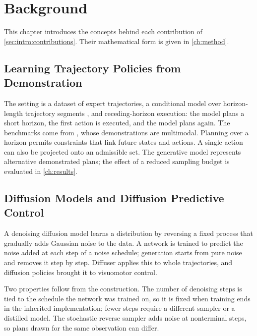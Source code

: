\chapter{Background}\label{ch:background}

This chapter introduces the concepts behind each contribution of \autoref{sec:intro:contributions}.
Their mathematical form is given in \autoref{ch:method}.

\section{Learning Trajectory Policies from Demonstration}\label{sec:bg:il}

The setting is a dataset of expert trajectories, a conditional model over horizon-length
trajectory segments \parencite{janner2022planning,chi2023diffusion}, and receding-horizon
execution: the model plans a short horizon, the first action is executed, and the model plans again.
The benchmarks come from \parencite{jia2024towards}, whose demonstrations are multimodal. Planning
over a horizon permits constraints that link future states and actions. A single action can also be
projected onto an admissible set. The generative model represents alternative demonstrated plans;
the effect of a reduced sampling budget is evaluated in \autoref{ch:results}.

\section{Diffusion Models and Diffusion Predictive Control}\label{sec:bg:diffusion}

A denoising diffusion model \parencite{sohl2015deep,ho2020denoising} learns a distribution by
reversing a fixed process that gradually adds Gaussian noise to the data. A network is trained to
predict the noise added at each step of a noise schedule; generation starts from pure noise and
removes it step by step. Diffuser \parencite{janner2022planning} applies this to whole trajectories,
and diffusion policies \parencite{chi2023diffusion} brought it to visuomotor control.

Two properties follow from the construction. The number of denoising steps is tied to the schedule
the network was trained on, so it is fixed when training ends in the inherited implementation; fewer steps require a different sampler
\parencite{song2021denoising} or a distilled model. The stochastic reverse sampler adds noise at nonterminal steps, so plans drawn
for the same observation can differ.

